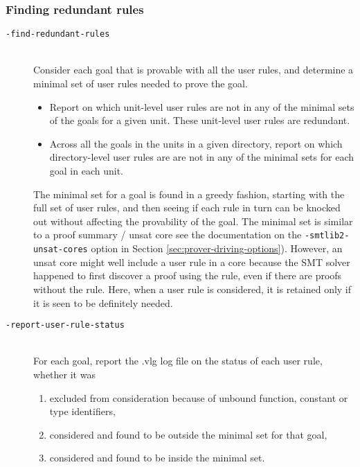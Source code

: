 \documentclass[12pt,fleqn]{article}
\newcommand{\optionb}[1]{\item[\texttt{-{#1}}]\ \\}
\begin{document}
\subsubsection{Finding redundant rules}

\begin{description}
  \optionb{find-redundant-rules} Consider each goal that is provable
  with all the user rules, and determine a minimal set of user rules
  needed to prove the goal.
    \begin{itemize}
    \item Report on which unit-level user rules are not in any of the
      minimal sets of the goals for a given unit.
      These unit-level user rules are redundant.
    \item Across all the goals in the units in a given directory, report 
      on which directory-level user rules are
      are not in any of the minimal sets for each goal in each unit.
    \end{itemize}
    The minimal set for a goal is found in a greedy fashion, starting
    with the full set of user rules, and then seeing if each rule in
    turn can be knocked out without affecting the provability of the
    goal.
    The minimal set is similar to a proof summary / unsat core 
     see the documentation on the \texttt{-smtlib2-unsat-cores} option in 
    Section \ref{sec:prover-driving-options}).
    However, an unsat core might well include a user rule in a core because
    the SMT solver happened to first discover a proof using the rule, even if
    there are proofs without the rule.
    Here, when a user rule is considered, it is retained only if it is seen
    to be definitely needed.

\optionb{report-user-rule-status}
  For each goal, report the .vlg log file on the status of each user
  rule, whether it was
  \begin{enumerate}
  \item excluded from consideration because of unbound function,
    constant or type identifiers,
  \item considered and found to be outside the minimal set for that goal,
  \item considered and found to be inside the minimal set.
  \end{enumerate}

  
\end{description}
\end{document}
